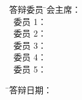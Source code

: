 \vspace{8mm}

\begin{tabbing}
\hspace{5mm}\songti\sihao 答辩委员 \hspace{-2.2mm} \= \songti\sihao 会主席： \= \underline{\makebox[9cm]{\sihao\zjucommitteemainc}} \\
          \>    \songti\sihao ~委员 1： \> \underline{\makebox[9cm]{\sihao\zjucommitteeonec}} \\
          \>    \songti\sihao ~委员 2： \> \underline{\makebox[9cm]{\sihao\zjucommitteetwoc}} \\
          \>    \songti\sihao ~委员 3： \> \underline{\makebox[9cm]{\sihao\zjucommitteethreec}} \\
          \>    \songti\sihao ~委员 4： \> \underline{\makebox[9cm]{\sihao\zjucommitteefourc}} \\
          \>    \songti\sihao ~委员 5： \> \underline{\makebox[9cm]{\sihao\zjucommitteefivec}}
\end{tabbing}

\vspace{8mm}

\begin{tabbing}
\hspace{34mm} \= \songti\sihao 答辩日期： \= \underline{\makebox[5cm]{\songti\sihao\zjudefencedatec}} \\
\end{tabbing}

